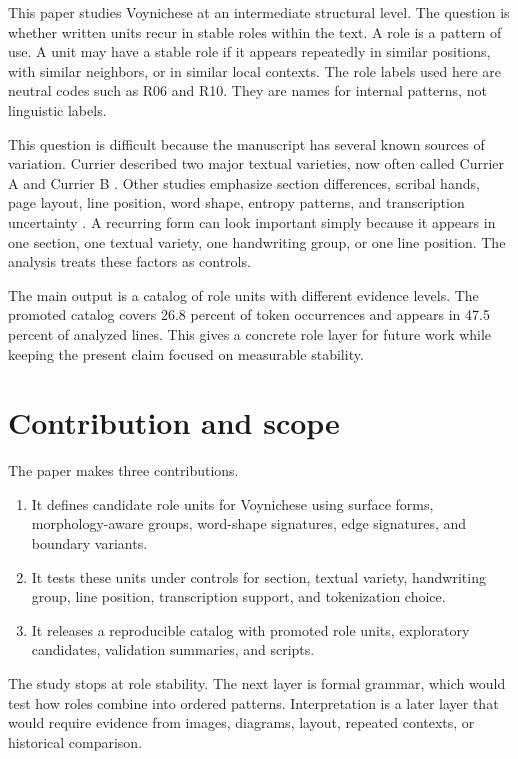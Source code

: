 \documentclass[11pt]{article}
\begin{document}
This paper studies Voynichese at an intermediate structural level. The question is whether written units recur in stable roles within the text. A role is a pattern of use. A unit may have a stable role if it appears repeatedly in similar positions, with similar neighbors, or in similar local contexts. The role labels used here are neutral codes such as R06 and R10. They are names for internal patterns, not linguistic labels.

This question is difficult because the manuscript has several known sources of variation. Currier described two major textual varieties, now often called Currier A and Currier B \cite{currier_1976}. Other studies emphasize section differences, scribal hands, page layout, line position, word shape, entropy patterns, and transcription uncertainty \cite{bowern_lindemann_2021}. A recurring form can look important simply because it appears in one section, one textual variety, one handwriting group, or one line position. The analysis treats these factors as controls.

The main output is a catalog of role units with different evidence levels. The promoted catalog covers 26.8 percent of token occurrences and appears in 47.5 percent of analyzed lines. This gives a concrete role layer for future work while keeping the present claim focused on measurable stability.

\section{Contribution and scope}

The paper makes three contributions.

\begin{enumerate}[label=\arabic*.]
\item It defines candidate role units for Voynichese using surface forms, morphology-aware groups, word-shape signatures, edge signatures, and boundary variants.
\item It tests these units under controls for section, textual variety, handwriting group, line position, transcription support, and tokenization choice.
\item It releases a reproducible catalog with promoted role units, exploratory candidates, validation summaries, and scripts.
\end{enumerate}

The study stops at role stability. The next layer is formal grammar, which would test how roles combine into ordered patterns. Interpretation is a later layer that would require evidence from images, diagrams, layout, repeated contexts, or historical comparison.
\end{document}
